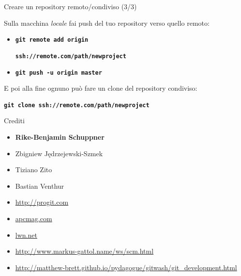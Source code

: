 \documentclass{beamer}
\begin{document}
\begin{frame}{\centerline{Creare un repository remoto/condiviso (3/3)}}

  \begin{block}{Sulla macchina \emph{locale} fai push del tuo repository verso quello remoto:}
    \begin{itemize}
    \item \texttt{\textbf{git remote add origin }}
          \begin{center}
            \texttt{\textbf{ssh://remote.com/path/newproject}}
      \end{center}
    \item \texttt{\textbf{git push \alert{-u} origin master}}
    \end{itemize}
  \end{block}
  E poi alla fine ognuno pu\`{o} fare un clone del repository condiviso:
  \begin{center}
    \texttt{\textbf{git clone ssh://remote.com/path/newproject}}
  \end{center}
\end{frame}


\begin{frame}{\centerline{Crediti}}
  \begin{itemize}
  \item \textbf{Rike-Benjamin Schuppner}
  \item Zbigniew J\k{e}drzejewski-Szmek
  \item Tiziano Zito
  \item Bastian Venthur
  \item \url{http://progit.com}
  \item \url{apcmag.com}
  \item \url{lwn.net}
  \item \url{http://www.markus-gattol.name/ws/scm.html}
  \item \url{http://matthew-brett.github.io/pydagogue/gitwash/git_development.html}
  \end{itemize}
\end{frame}
\end{document}
